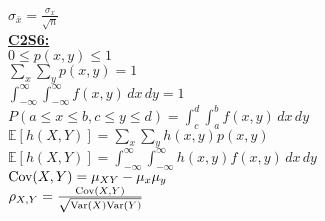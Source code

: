 \documentclass[letter, 12pt]{article}
\begin{document}
\begin{multicols}{2}
\(\sigma_{\bar{x}} = \frac{\sigma_x}{\sqrt{n}}\)\\
\textbf{\uline{C2S6:}}\\
\(0 \leq p(x,y) \leq 1\)\\
\(\sum_x \sum_y p(x,y) = 1\)\\
\(\int_{-\infty}^\infty \int_{-\infty}^\infty f(x,y)\,dx\,dy = 1\)\\
\(P(a \leq x \leq b, c \leq y \leq d) = \int_c^d \int_a^b f(x,y) \,dx\,dy\)\\
\(\mathds{E}[h(X,Y)] = \sum_x \sum_y h(x, y) p(x, y)\)\\
\(\mathds{E}[h(X,Y)] = \int_{-\infty}^\infty \int_{-\infty}^\infty h(x, y) f(x, y)\,dx\,dy\)\\
\(\textnormal{Cov}(X,Y) = \mu_{XY}-\mu_x\mu_y\)\\
\(\rho_{X,Y} = \frac{\textnormal{Cov}(X,Y)}{\sqrt{\textnormal{Var}(X)\textnormal{Var}(Y)}}\)\\
\vfill
\columnbreak
\vspace*{\fill}
\end{multicols}
\end{document}
